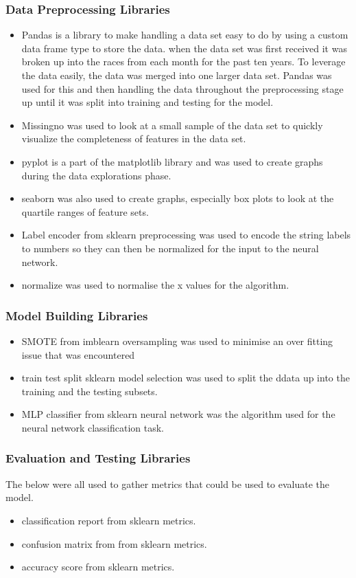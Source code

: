 \subsubsection{Data Preprocessing Libraries}
\begin{itemize}
    \item Pandas is a library to make handling a data set easy to do by using a custom data frame type to store the data. when the data set was first received it was broken up into the races from each month for the past ten years. To leverage the data easily, the data was merged into one larger data set. Pandas was used for this and then handling the data throughout the preprocessing stage up until it was split into training and testing for the model. 
    \item Missingno was used to look at a small sample of the data set to quickly visualize the completeness of features in the data set. 
    \item pyplot is a part of the matplotlib library and was used to create graphs during the data explorations phase.
    \item seaborn was also used to create graphs, especially box plots to look at the quartile ranges of feature sets. 
    \item Label encoder  from sklearn preprocessing was used to encode the string labels to numbers so they can then be normalized for the input to the neural network.
    \item normalize was used to normalise the x values for the algorithm.
\end{itemize}
\subsubsection{Model Building Libraries}
\begin{itemize}
    \item SMOTE from imblearn oversampling was used to minimise an over fitting issue that was encountered 
    \item train test split sklearn model selection was used to split the ddata up into the training and the testing subsets.
    \item MLP classifier from sklearn neural network was the algorithm used for the neural network classification task. 
\end{itemize}
\subsubsection{Evaluation and Testing Libraries}
The below were all used to gather metrics that could be used to evaluate the model.
\begin{itemize}
    \item classification report from sklearn metrics.
    \item confusion matrix from from sklearn metrics.
    \item accuracy score from sklearn metrics.
\end{itemize}

